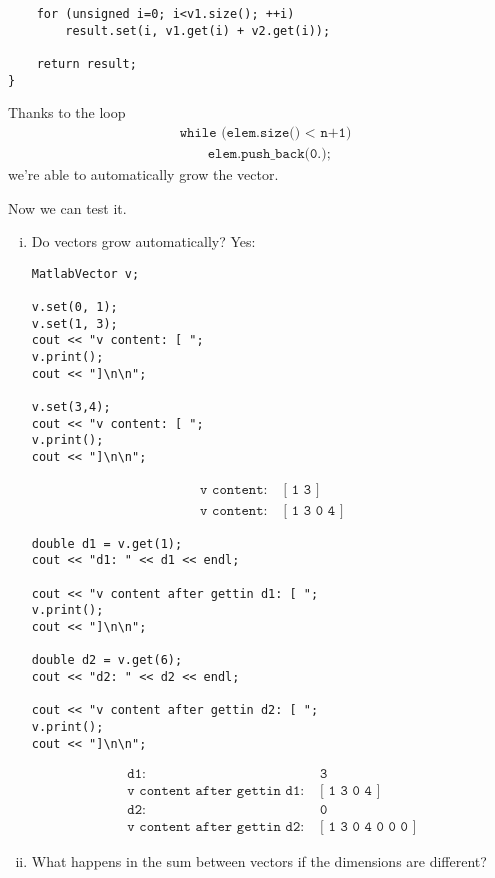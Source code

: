 \begin{enumerate}[$\triangleright$]
\begin{lstlisting}
    for (unsigned i=0; i<v1.size(); ++i)
        result.set(i, v1.get(i) + v2.get(i));

    return result;
}
\end{lstlisting}

\begin{marker}
Thanks to the loop
\begin{align*}
    &\texttt{while (elem.size() < n+1)} \\
    &\qquad \texttt{elem.push\_back(0.);}
\end{align*}
we're able to automatically grow the vector.
\end{marker}

Now we can test it.

\begin{enumerate}[(i)]
\item Do vectors grow automatically? Yes:

\begin{lstlisting}
MatlabVector v;

v.set(0, 1);
v.set(1, 3);
cout << "v content: [ ";
v.print();
cout << "]\n\n";

v.set(3,4);
cout << "v content: [ ";
v.print();
cout << "]\n\n";
\end{lstlisting}
\begin{align*}
\texttt{v content: } &\texttt{[ 1 3 ]} \\
\texttt{v content: } &\texttt{[ 1 3 0 4 ]}
\end{align*}

\begin{lstlisting}
double d1 = v.get(1);
cout << "d1: " << d1 << endl;

cout << "v content after gettin d1: [ ";
v.print();
cout << "]\n\n";

double d2 = v.get(6);
cout << "d2: " << d2 << endl;

cout << "v content after gettin d2: [ ";
v.print();
cout << "]\n\n";
\end{lstlisting}
\begin{align*}
\texttt{d1: } &\texttt{3} \\
\texttt{v content after gettin d1: } &\texttt{[ 1 3 0 4 ]} \\
\texttt{d2: } &\texttt{0} \\
\texttt{v content after gettin d2: } &\texttt{[ 1 3 0 4 0 0 0 ]}
\end{align*}

\item What happens in the sum between vectors if the dimensions are different?


\end{enumerate}
\end{enumerate}
